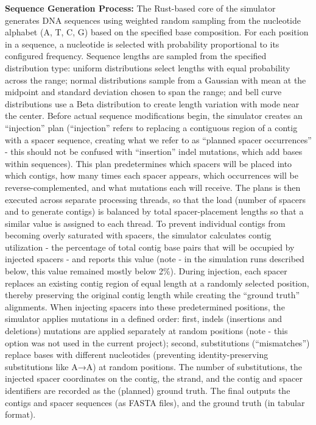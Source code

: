 \documentclass[
]{article}
\begin{document}
\textbf{Sequence Generation Process:} The Rust-based core of the
simulator generates DNA sequences using weighted random sampling from
the nucleotide alphabet (A, T, C, G) based on the specified base
composition. For each position in a sequence, a nucleotide is selected
with probability proportional to its configured frequency. Sequence
lengths are sampled from the specified distribution type: uniform
distributions select lengths with equal probability across the range;
normal distributions sample from a Gaussian with mean at the midpoint
and standard deviation chosen to span the range; and bell curve
distributions use a Beta distribution to create length variation with
mode near the center. Before actual sequence modifications begin, the
simulator creates an ``injection'' plan (``injection'' refers to
replacing a contiguous region of a contig with a spacer sequence,
creating what we refer to as ``planned spacer occurrences'' - this
should not be confused with ``insertion'' indel mutations, which add
bases within sequences). This plan predetermines which spacers will be
placed into which contigs, how many times each spacer appears, which
occurrences will be reverse-complemented, and what mutations each will
receive. The plans is then executed across separate processing threads,
so that the load (number of spacers and to generate contigs) is balanced
by total spacer-placement lengths so that a similar value is assigned to
each thread. To prevent individual contigs from becoming overly
saturated with spacers, the simulator calculates contig utilization -
the percentage of total contig base pairs that will be occupied by
injected spacers - and reports this value (note - in the simulation runs
described below, this value remained mostly below 2\%). During
injection, each spacer replaces an existing contig region of equal
length at a randomly selected position, thereby preserving the original
contig length while creating the ``ground truth'' alignments. When
injecting spacers into these predetermined positions, the simulator
applies mutations in a defined order: first, indels (insertions and
deletions) mutations are applied separately at random positions (note -
this option was not used in the current project); second, substitutions
(``mismatches'') replace bases with different nucleotides (preventing
identity-preserving substitutions like A→A) at random positions. The
number of substitutions, the injected spacer coordinates on the contig,
the strand, and the contig and spacer identifiers are recorded as the
(planned) ground truth. The final outputs the contigs and spacer
sequences (as FASTA files), and the ground truth (in tabular format).
\end{document}
